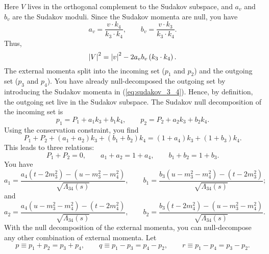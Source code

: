 Here $V$ lives in the orthogonal complement to the Sudakov subspace, and $a_{v}$ and $b_{v}$ are the Sudakov moduli. Since the Sudakov momenta are null, you have
\begin{equation}
	a_{v} = \frac{v \cdot k_{4}}{k_{3} \cdot k_{4}}, \qquad b_{v} = \frac{v \cdot k_{3}}{k_{3} \cdot k_{4}}.
\end{equation}
Thus,
\begin{equation}
	\left\lvert V \right\rvert^{2} = \left\lvert v \right\rvert^{2} - 2 a_{v} b_{v} \left( k_{3} \cdot k_{4} \right).
\end{equation}
The external momenta split into the incoming set ($p_{1}$ and $p_{2}$) and the outgoing set ($p_{3}$ and $p_{4}$). You have already null-decomposed the outgoing set by introducing the Sudakov momenta in (\ref{eq:sudakov_3_4}). Hence, by definition, the outgoing set live in the Sudakov subspace. The Sudakov null decomposition of the incoming set is
\begin{equation}
	p_{1} = P_{1} + a_{1} k_{3} + b_{1} k_{4}, \qquad p_{2} = P_{2} + a_{2} k_{3} + b_{2} k_{4}.
\end{equation}
Using the conservation constraint, you find
\begin{equation}
	P_{1} + P_{2} + \left( a_{1} + a_{2} \right) k_{3} + \left( b_{1} + b_{2} \right) k_{4} = \left( 1 + a_{4} \right) k_{3} + \left( 1 + b_{3} \right) k_{4}.
\end{equation}
This leads to three relations:
\begin{equation}
	P_{1} + P_{2} = 0, \qquad a_{1} + a_{2} = 1 + a_{4}, \qquad b_{1} + b_{2} = 1 + b_{3}.
	\label{eq:conv_rel}
\end{equation}
You have
\begin{equation}
	a_{1} = \frac{a_{4} \left( t - 2 m_{3}^{2} \right) - \left( u - m_{3}^{2} - m_{4}^{2} \right) }{\sqrt{\Lambda_{34}(s)}}, \qquad
	b_{1} = \frac{b_{3} \left( u - m_{3}^{2} - m_{4}^{2} \right) - \left( t - 2 m_{3}^{2} \right) }{\sqrt{\Lambda_{34}(s)}};
\end{equation}
and
\begin{equation}
	a_{2} = \frac{a_{4} \left( u - m_{3}^{2} - m_{4}^{2} \right) - \left( t - 2 m_{4}^{2} \right) }{\sqrt{\Lambda_{34}(s)}}, \qquad
	b_{2} = \frac{b_{3} \left( t - 2 m_{4}^{2} \right) - \left( u - m_{3}^{2} - m_{4}^{2} \right) }{\sqrt{\Lambda_{34}(s)}}.
\end{equation}
With the null decomposition of the external momenta, you can null-decompose any other combination of external momenta. Let
\begin{equation}
	p \equiv p_{1} + p_{2} = p_{3} + p_{4}, \qquad q \equiv p_{1} - p_{3} = p_{4} - p_{2}, \qquad r \equiv p_{1} - p_{4} = p_{3} - p_{2}.
\end{equation}
